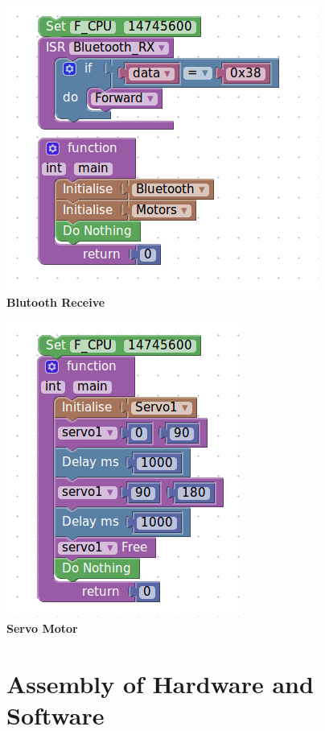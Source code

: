 \documentclass[a4paper,12pt,oneside]{book}
\begin{document}
\begin{center}
    \includegraphics[scale =0.6]{blerecimp}\\[.3in]
    \textbf{Blutooth Receive}\\[1.3in]
    \end{center}
    
\begin{center}
    \includegraphics[scale =0.6]{servosam}\\[.3in]
    \textbf{Servo Motor}\\[1.3in]
    \end{center}
    
    
\newpage\section{Assembly of Hardware and Software}
\end{document}
